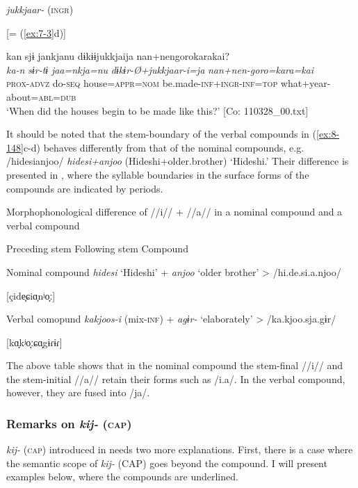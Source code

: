 \textit{jukkjaar-} (\textsc{ingr})

\ex{}  [= (\ref{ex:7-3}d)]

{\TM}
\glll  kan  sjɨ  jankjanu  dɨkɨɨjukkjaija  {\textbar}nan+nengoro{\textbar}karakai?\\
\textit{ka-n}  \textit{sɨr-tɨ}  \textit{jaa=nkja=nu}  \textit{dɨkɨr-Ø+jukkjaar-i=ja}    \textit{nan+nen-goro=kara=kai}\\
\textsc{prox}-\textsc{advz}  do-\textsc{seq}  house=\textsc{appr}=\textsc{nom}  be.made-\textsc{inf}+\textsc{ingr}-\textsc{inf}=\textsc{top}   what+year-about=\textsc{abl}=\textsc{dub}\\
\glt ‘When did the houses begin to be made like this?’ [Co: 110328\_00.txt]
\z
\z

It should be noted that the stem-boundary of the verbal compounds in (\ref{ex:8-148}c-d) behaves differently from that of the nominal compounds, e.g. /hidesianjoo/ \textit{hidesi+anjoo} (Hideshi+older.brother) ‘Hideshi.’ Their difference is presented in , where the syllable boundaries in the surface forms of the compounds are indicated by periods.

\begin{table}
\caption{\label{tab:key:88}Morphophonological difference of //i// + //a// in a nominal compound and a verbal compound}
  Preceding stem    Following stem    Compound

Nominal compound  \textit{hidesi}  ‘Hideshi’  +  \textit{anjoo}  ‘older brother’  >  /hi.de.si.a.njoo/

[çide̞ɕiɑ̞nʲo̞ː]

Verbal comopund  \textit{kakjoos-i}  (mix-\textsc{inf})  +  \textit{agɨr-}  ‘elaborately’  >  /ka.kjoo.sja.gɨr/

[kɑ̞kʲo̞ːɕɑ̞gɨɾɨɾ]
\end{table}


The above table shows that in the nominal compound the stem-final //i// and the stem-initial //a// retain their forms such as /i.a/. In the verbal compound, however, they are fused into /ja/.

\subsubsection{Remarks on \textit{kij-} (\textsc{cap})}

\textit{kij-} (\textsc{cap}) introduced in  needs two more explanations. First, there is a case where the semantic scope of \textit{kij-} (CAP) goes beyond the compound. I will present examples below, where the compounds are underlined.

